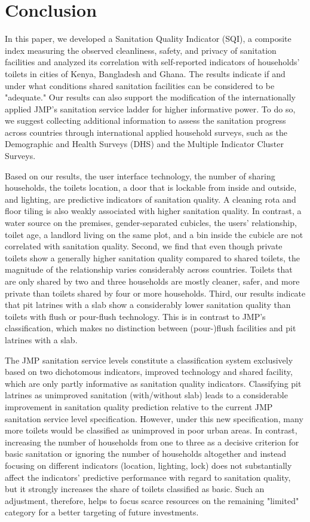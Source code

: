 \documentclass[natbib]{svjour3}                     %
\begin{document}
\section{Conclusion}
\label{sec:conclusion}
In this paper, we developed a Sanitation Quality Indicator (SQI), a composite index measuring the observed cleanliness, safety, and privacy of sanitation facilities and analyzed its correlation with self-reported indicators of households’ toilets in cities of Kenya, Bangladesh and Ghana. The results indicate if and under what conditions shared sanitation facilities can be considered to be "adequate." Our results can also support the modification of the internationally applied JMP's sanitation service ladder for higher informative power. To do so, we suggest collecting additional information to assess the sanitation progress across countries through international applied household surveys, such as the Demographic and Health Surveys (DHS) and the Multiple Indicator Cluster Surveys.

Based on our results, the user interface technology, the number of sharing households, the toilets location, a door that is lockable from inside and outside, and lighting, are predictive indicators of sanitation quality. A cleaning rota and floor tiling is also weakly associated with higher sanitation quality. In contrast, a water source on the premises, gender-separated cubicles, the users' relationship, toilet age, a landlord living on the same plot, and a bin inside the cubicle are not correlated with sanitation quality. Second, we find that even though private toilets show a generally higher sanitation quality compared to shared toilets, the magnitude of the relationship varies considerably across countries. Toilets that are only shared by two and three households are mostly cleaner, safer, and more private than toilets shared by four or more households. Third, our results indicate that pit latrines with a slab show a considerably lower sanitation quality than toilets with flush or pour-flush technology. This is in contrast to JMP's classification, which makes no distinction between (pour-)flush facilities and pit latrines with a slab.

The JMP sanitation service levels constitute a classification system exclusively based on two dichotomous indicators, improved technology and shared facility, which are only partly informative as sanitation quality indicators. Classifying pit latrines as unimproved sanitation (with/without slab) leads to a considerable improvement in sanitation quality prediction relative to the current JMP sanitation service level specification. However, under this new specification, many more toilets would be classified as unimproved in poor urban areas. In contrast, increasing the number of households from one to three as a decisive criterion for basic sanitation or ignoring the number of households altogether and instead focusing on different indicators (location, lighting, lock) does not substantially affect the indicators’ predictive performance with regard to sanitation quality, but it strongly increases the share of toilets classified as basic. Such an adjustment, therefore, helps to focus scarce resources on the remaining "limited" category for a better targeting of future investments. 
\end{document}
